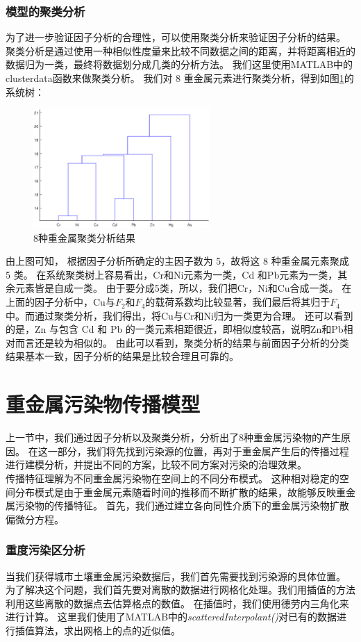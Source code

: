 \documentclass[a4paper]{article}
\begin{document}
\section{模型的聚类分析}
为了进一步验证因子分析的合理性，可以使用聚类分析来验证因子分析的结果。
聚类分析是通过使用一种相似性度量来比较不同数据之间的距离，并将距离相近的数据归为一类，最终将数据划分成几类的分析方法。
我们这里使用MATLAB中的clusterdata函数来做聚类分析。
我们对 8 重金属元素进行聚类分析，得到如图\ref{fig:cluster}的系统树：
\begin{figure}
    \includegraphics[width=0.6\textwidth,bb=80 420 500 720]{pictures/cluster.eps}
    \caption{8种重金属聚类分析结果}
    \label{fig:cluster}
\end{figure}
由上图可知， 根据因子分析所确定的主因子数为 5，故将这 8 种重金属元素聚成 5 类。
在系统聚类树上容易看出，Cr和Ni元素为一类，Cd 和Pb元素为一类，其余元素皆是自成一类。
由于要分成5类，所以，我们把Cr，Ni和Cu合成一类。
在上面的因子分析中，Cu与$F_2$和$F_4$的载荷系数均比较显著，我们最后将其归于$F_4$中。而通过聚类分析，我们得出，将Cu与Cr和Ni归为一类更为合理。
还可以看到的是，Zn 与包含 Cd 和 Pb 的一类元素相距很近，即相似度较高，说明Zn和Pb相对而言还是较为相似的。
由此可以看到，聚类分析的结果与前面因子分析的分类结果基本一致，因子分析的结果是比较合理且可靠的。


\part{重金属污染物传播模型}
上一节中，我们通过因子分析以及聚类分析，分析出了8种重金属污染物的产生原因。
在这一部分，我们将先找到污染源的位置，再对于重金属产生后的传播过程进行建模分析，并提出不同的方案，比较不同方案对污染的治理效果。\\
\indent 传播特征理解为不同重金属污染物在空间上的不同分布模式。
这种相对稳定的空间分布模式是由于重金属元素随着时间的推移而不断扩散的结果，故能够反映重金属污染物的传播特征。
首先，我们通过建立各向同性介质下的重金属污染物扩散偏微分方程。
\section{重度污染区分析}
当我们获得城市土壤重金属污染数据后，我们首先需要找到污染源的具体位置。\\
\indent 为了解决这个问题，我们首先要对离散的数据进行网格化处理。我们用插值的方法利用这些离散的数据点去估算格点的数值。
在插值时，我们使用德劳内三角化来进行计算。
这里我们使用了MATLAB中的\emph{scatteredInterpolant()}对已有的数据进行插值算法，求出网格上的点的近似值。
\end{document}
